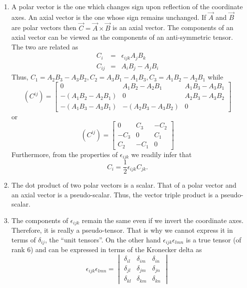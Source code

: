 \begin{enumerate}
\item A polar vector is the one which changes sign upon reflection of the coordinate
axes. An axial vector is the one whose sign remains unchanged. If $\vec{A}$ and 
$\vec{B}$ are polar vectors then $\vec{C} = \vec{A} \times \vec{B}$ is an axial
vector. The components of an axial vector can be viewed as the components of an
anti-symmetric tensor. The two are related as 
\begin{eqnarray}
C_i &=& \epsilon_{ijk}A_jB_k \label{c1e55} \\
C_{ij} &=& A_iB_j - A_jB_i \label{c1e56}
\end{eqnarray}
Thus, $C_1 = A_2B_3 - A_3B_2, C_2 = A_3B_1 - A_1B_3, C_3 = A_1B_2 - A_2B_1$ while
\begin{equation}\label{c1e57}
(C^{ij}) = \begin{bmatrix}0 & A_1B_2 - A_2B_1 & A_1B_3 - A_3B_1 \\
-(A_1B_2 - A_2B_1) & 0 & A_2B_3 - A_3B_2 \\
-(A_1B_3 - A_3B_1) & -(A_2B_3 - A_3B_2) & 0
\end{bmatrix}
\end{equation}
or
\begin{equation}\label{c1e58}
(C^{ij}) = \begin{bmatrix}0 & C_3 & -C_2 \\ -C_3 & 0 & C_1 \\ C_2 & -C_1 & 0
\end{bmatrix}
\end{equation}
Furthermore, from the properties of $\epsilon_{ijk}$ we readily infer that
\begin{equation}\label{c1e59}
C_i = \frac{1}{2}\epsilon_{ijk}C_{jk}.
\end{equation}

\item The dot product of two polar vectors is a scalar. That of a polar vector
and an axial vector is a pseudo-scalar. Thus, the vector triple product is a
pseudo-scalar.

\item The components of $\epsilon_{ijk}$ remain the same even if we invert the
coordinate axes. Therefore, it is really a pseudo-tensor. That is why we cannot 
express it in terms of $\delta_{ij}$, the ``unit tensors''. On the other hand
$\epsilon_{ijk}\epsilon_{lmn}$ is a true tensor (of rank $6$) and can be expressed
in terms of the Kronecker delta as
\begin{equation}\label{c1e60}
\epsilon_{ijk}\epsilon_{lmn} = \begin{vmatrix}
\delta_{il} & \delta_{im} & \delta_{in} \\
\delta_{jl} & \delta_{jm} & \delta_{jn} \\
\delta_{kl} & \delta_{km} & \delta_{kn}
\end{vmatrix}
\end{equation}


\end{enumerate}
